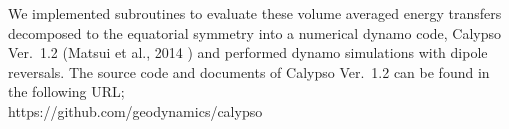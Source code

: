 {\color{blue}
We implemented subroutines to evaluate these volume averaged energy transfers decomposed to the equatorial symmetry into a numerical dynamo code, Calypso Ver.~1.2
\color{red}
(Matsui et al., 2014 \cite{Matsui:2014}) and performed dynamo simulations with dipole reversals.
%
The source code and documents of Calypso Ver.~1.2 can be found in the following URL;\\
https://github.com/geodynamics/calypso\\
}